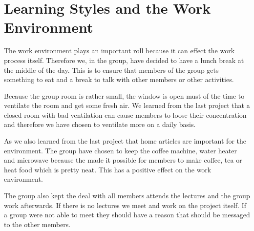\section{Learning Styles and the Work Environment}
The work environment plays an important roll because it can effect the work process itself. Therefore we, in the group, have decided to have a lunch break at the middle of the day. This is to ensure that members of the group gets something to eat and a break to talk with other members or other activities.

Because the group room is rather small, the window is open must of the time to ventilate the room and get some fresh air. We learned from the last project that a closed room with bad ventilation can cause members to loose their concentration and therefore we have chosen to ventilate more on a daily basis.

As we also learned from the last project that home articles are important for the environment. The group have chosen to keep the coffee machine, water heater and microwave because the made it possible for members to make coffee, tea or heat food which is pretty neat. This has a positive effect on the work environment.

The group also kept the deal with all members attends the lectures and the group work afterwards. If there is no lectures we meet and work on the project itself.
If a group were not able to meet they should have a reason that should be messaged to the other members.